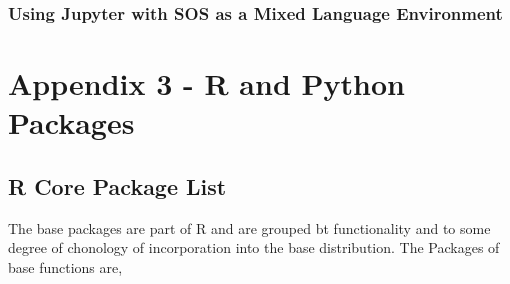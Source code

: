 \documentclass[]{book}
\theoremstyle{definition}
\theoremstyle{definition}
\theoremstyle{definition}
\theoremstyle{remark}
\begin{document}
\subsection{Using Jupyter with SOS as a Mixed Language
Environment}\label{using-jupyter-with-sos-as-a-mixed-language-environment}

\chapter{Appendix 3 - R and Python
Packages}\label{appendix-3---r-and-python-packages}

\section{R Core Package List}\label{r-core-package-list}

The base packages are part of R and are grouped bt functionality and to
some degree of chonology of incorporation into the base distribution.
The Packages of base functions are,
\end{document}
